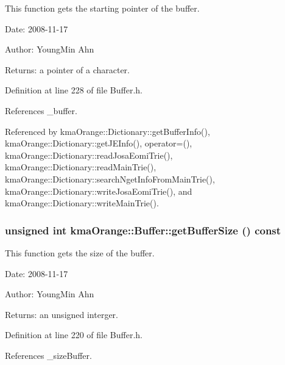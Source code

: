 This function gets the starting pointer of the buffer. 

\begin{Desc}
\item[Date:]2008-11-17 \end{Desc}
\begin{Desc}
\item[Author:]YoungMin Ahn \end{Desc}
\begin{Desc}
\item[Returns:]a pointer of a character. \end{Desc}


Definition at line 228 of file Buffer.h.

References \_\-buffer.

Referenced by kmaOrange::Dictionary::getBufferInfo(), kmaOrange::Dictionary::getJEInfo(), operator=(), kmaOrange::Dictionary::readJosaEomiTrie(), kmaOrange::Dictionary::readMainTrie(), kmaOrange::Dictionary::searchNgetInfoFromMainTrie(), kmaOrange::Dictionary::writeJosaEomiTrie(), and kmaOrange::Dictionary::writeMainTrie().\hypertarget{classkmaOrange_1_1Buffer_2e3c1afe4c305888ec50458256a9e2d6}{
\subsubsection[{getBufferSize}]{\setlength{\rightskip}{0pt plus 5cm}unsigned int kmaOrange::Buffer::getBufferSize () const}}
\label{classkmaOrange_1_1Buffer_2e3c1afe4c305888ec50458256a9e2d6}


This function gets the size of the buffer. 

\begin{Desc}
\item[Date:]2008-11-17 \end{Desc}
\begin{Desc}
\item[Author:]YoungMin Ahn \end{Desc}
\begin{Desc}
\item[Returns:]an unsigned interger. \end{Desc}


Definition at line 220 of file Buffer.h.

References \_\-sizeBuffer.

